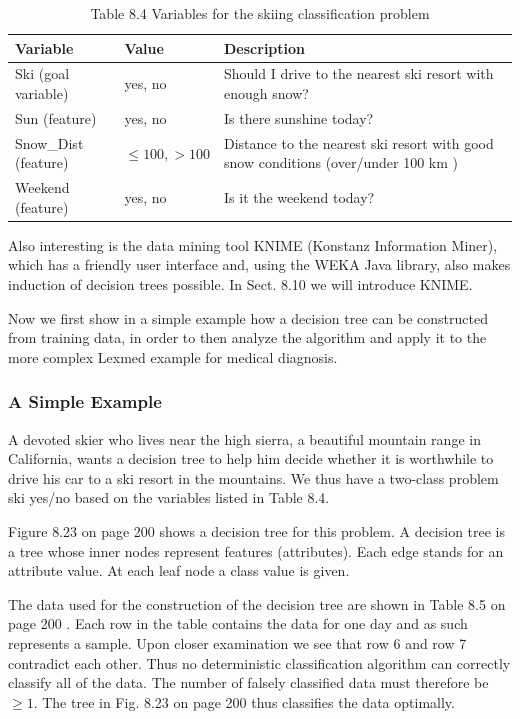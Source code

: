 \documentclass[10pt]{book}
\begin{document}
\begin{table}[htbp]
\begin{center}
\captionsetup{labelformat=empty}
\caption{Table 8.4 Variables for the skiing classification problem}
\begin{tabular}{|l|l|l|}
\hline
Variable & Value & Description \\
\hline
Ski (goal variable) & yes, no & Should I drive to the nearest ski resort with enough snow? \\
\hline
Sun (feature) & yes, no & Is there sunshine today? \\
\hline
Snow\_Dist (feature) & $\leq 100,>100$ & Distance to the nearest ski resort with good snow conditions (over/under 100 km ) \\
\hline
Weekend (feature) & yes, no & Is it the weekend today? \\
\hline
\end{tabular}
\end{center}
\end{table}

Also interesting is the data mining tool KNIME (Konstanz Information Miner), which has a friendly user interface and, using the WEKA Java library, also makes induction of decision trees possible. In Sect. 8.10 we will introduce KNIME.


Now we first show in a simple example how a decision tree can be constructed from training data, in order to then analyze the algorithm and apply it to the more complex Lexmed example for medical diagnosis.

\subsubsection*{A Simple Example}
A devoted skier who lives near the high sierra, a beautiful mountain range in California, wants a decision tree to help him decide whether it is worthwhile to drive his car to a ski resort in the mountains. We thus have a two-class problem ski yes/no based on the variables listed in Table 8.4.

Figure 8.23 on page 200 shows a decision tree for this problem. A decision tree is a tree whose inner nodes represent features (attributes). Each edge stands for an attribute value. At each leaf node a class value is given.

The data used for the construction of the decision tree are shown in Table 8.5 on page 200 . Each row in the table contains the data for one day and as such represents a sample. Upon closer examination we see that row 6 and row 7 contradict each other. Thus no deterministic classification algorithm can correctly classify all of the data. The number of falsely classified data must therefore be $\geq 1$. The tree in Fig. 8.23 on page 200 thus classifies the data optimally.
\end{document}
